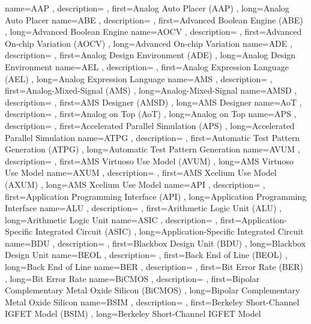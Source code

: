 { name={AAP}
, description={}
, first={Analog Auto Placer (AAP)}
, long={Analog Auto Placer}
}
{ name={ABE}
, description={}
, first={Advanced Boolean Engine (ABE)}
, long={Advanced Boolean Engine}
}
{ name={AOCV}
, description={}
, first={Advanced On-chip Variation (AOCV)}
, long={Advanced On-chip Variation}
}
{ name={ADE}
, description={}
, first={Analog Design Environment (ADE)}
, long={Analog Design Environment}
}
{ name={AEL}
, description={}
, first={Analog Expression Language (AEL)}
, long={Analog Expression Language}
}
{ name={AMS}
, description={}
, first={Analog-Mixed-Signal (AMS)}
, long={Analog-Mixed-Signal}
}
{ name={AMSD}
, description={}
, first={AMS Designer (AMSD)}
, long={AMS Designer}
}
{ name={AoT}
, description={}
, first={Analog on Top (AoT)}
, long={Analog on Top}
}
{ name={APS}
, description={}
, first={Accelerated Parallel Simulation (APS)}
, long={Accelerated Parallel Simulation}
}
{ name={ATPG}
, description={}
, first={Automatic Test Pattern Generation (ATPG)}
, long={Automatic Test Pattern Generation}
}
{ name={AVUM}
, description={}
, first={AMS Virtuoso Use Model (AVUM)}
, long={AMS Virtuoso Use Model}
}
{ name={AXUM}
, description={}
, first={AMS Xcelium Use Model (AXUM)}
, long={AMS Xcelium Use Model}
}
{ name={API}
, description={}
, first={Application Programming Interface (API)}
, long={Application Programming Interface}
}
{ name={ALU}
, description={}
, first={Arithmetic Logic Unit (ALU)}
, long={Arithmetic Logic Unit}
}
{ name={ASIC}
, description={}
, first={Application-Specific Integrated Circuit (ASIC)}
, long={Application-Specific Integrated Circuit}
}
{ name={BDU}
, description={}
, first={Blackbox Design Unit (BDU)}
, long={Blackbox Design Unit}
}
{ name={BEOL}
, description={}
, first={Back End of Line (BEOL)}
, long={Back End of Line}
}
{ name={BER}
, description={}
, first={Bit Error Rate (BER)}
, long={Bit Error Rate}
}
{ name={BiCMOS}
, description={}
, first={Bipolar Complementary Metal Oxide Silicon (BiCMOS)}
, long={Bipolar Complementary Metal Oxide Silicon}
}
{ name={BSIM}
, description={}
, first={Berkeley Short-Channel IGFET Model (BSIM)}
, long={Berkeley Short-Channel IGFET Model}
}
